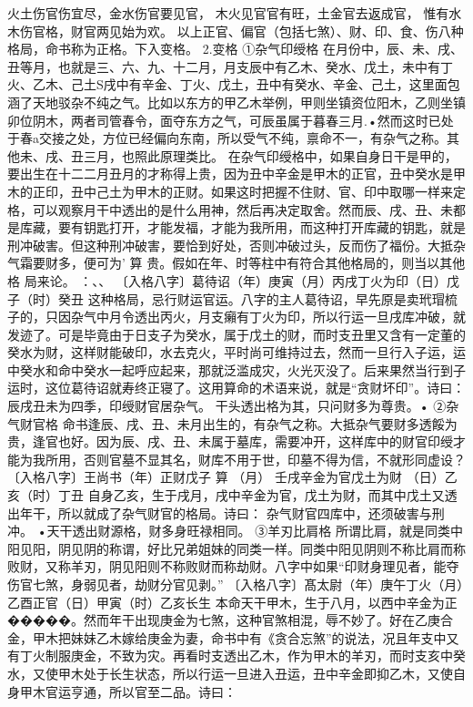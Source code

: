 火土伤官伤宜尽，金水伤官要见官，
木火见官官有旺，土金官去返成官，
惟有水木伤官格，财官两见始为欢。
以上正官、偏官（包括七煞）、财、印、食、伤八种格局，命书称为正格。下入变格。
2.变格
①杂气印绶格
在月份中，辰、未、戌、丑等月，也就是三、六、九、十二月，月支辰中有乙木、癸水、戊土，未中有丁火、乙木、己土S戌中有辛金、丁火、戊土，丑中有癸水、辛金、己土，这里面包涵了天地驳杂不纯之气。比如以东方的甲乙木举例，甲则坐镇资位阳木，乙则坐镇卯位阴木，两者司管春令，面夺东方之气，可辰虽属于暮春三月.•然而这时已处于春a交接之处，方位已经偏向东南，所以受气不纯，禀命不一，有杂气之称。其他未、戌、丑三月，也照此原理类比。
在杂气印绶格中，如果自身日干是甲的，要出生在十二二月丑月的才称得上贵，因为丑中辛金是甲木的正官，丑中癸水是甲木的正印，丑中己土为甲木的正财。如果这时把握不住财、官、印中取哪一样来定格，可以观察月干中透出的是什么用神，然后再决定取舍。然而辰、戌、丑、未都是库藏，要有钥匙打开，才能发福，才能为我所用，而这种打开库藏的钥匙，就是刑冲破害。但这种刑冲破害，要恰到好处，否则冲破过头，反而伤了福份。大抵杂气霜要财多，便可为’
算
贵。假如在年、时等柱中有符合其他格局的，则当以其他格
局来论。	：、、
〔入格八字〕葛待诏（年）庚寅（月）丙戌丁火为印（日）戊子（时）癸丑
这种格局，忌行财运官运。八字的主人葛待诏，早先原是卖玳瑁梳子的，只因杂气中月令透出丙火，月支癩有丁火为印，所以行运一旦戌库冲破，就发迹了。可是毕竟由于日支子为癸水，属于戊土的财，而时支丑里又含有一定董的癸水为财，这样财能破印，水去克火，平时尚可维持过去，然而一旦行入子运，运中癸水和命中癸水一起呼应起来，那就泛滥成灾，火光灭没了。后来果然当行到子运时，这位葛待诏就寿终正寝了。这用算命的术语来说，就是“贪财坏印”。诗曰：
辰戌丑未为四季，印绶财官居杂气。
干头透出格为其，只问财多为尊贵。•
②杂气财官格
命书逢辰、戌、丑、未月出生的，有杂气之称。大抵杂气要财多透餒为贵，逢官也好。因为辰、戌、丑、未属于墓库，需要冲开，这样库中的财官印绶才能为我所用，否则官墓不显其名，财库不用于世，印墓不得为信，不就形同虚设？〔入格八字〕王尚书（年）正财戊子
算
（月）	壬戌辛金为官戊土为财
（日）乙亥（时）丁丑
自身乙亥，生于戌月，戌中辛金为官，戊土为财，而其中戊土又透出年干，所以就成了杂气财官的格局。诗曰：
杂气财官四库中，还须破害与刑冲。
•天干透出财源格，财多身旺禄相同。
③羊刃比肩格
所谓比肩，就是同类中阳见阳，阴见阴的称谓，好比兄弟姐妹的同类一样。同类中阳见阴则不称比肩而称败财，又称羊刃，阴见阳则不称败财而称劫财。八字中如果“印财身理见者，能夺伤官七煞，身弱见者，劫财分官见剥。”
〔入格八字〕髙太尉（年）庚午丁火（月）乙酉正官（日）甲寅（时）乙亥长生
本命天干甲木，生于八月，以西中辛金为正�����。然而年干出现庚金为七煞，这种官煞相混，辱不妙了。好在乙庚合金，甲木把妹妹乙木嫁给庚金为妻，命书中有《贪合忘煞”的说法，况且年支中又有丁火制服庚金，不致为灾。再看时支透出乙木，作为甲木的羊刃，而时支亥中癸水，又使甲木处于长生状态，所以行运一旦进入丑运，丑中辛金即抑乙木，又使自身甲木官运亨通，所以官至二品。诗曰：
